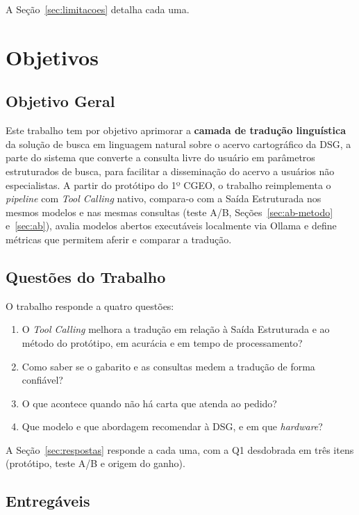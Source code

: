 A Seção~\ref{sec:limitacoes} detalha cada uma.

\section{Objetivos}

\subsection{Objetivo Geral}

Este trabalho tem por objetivo aprimorar a \textbf{camada de tradução linguística} da solução de busca em linguagem natural sobre o acervo cartográfico da DSG, a parte do sistema que converte a consulta livre do usuário em parâmetros estruturados de busca, para facilitar a disseminação do acervo a usuários não especialistas. A partir do protótipo do 1º CGEO, o trabalho reimplementa o \textit{pipeline} com \textit{Tool Calling} nativo, compara-o com a Saída Estruturada nos mesmos modelos e nas mesmas consultas (teste A/B, Seções~\ref{sec:ab-metodo} e~\ref{sec:ab}), avalia modelos abertos executáveis localmente via Ollama e define métricas que permitem aferir e comparar a tradução.

\subsection{Questões do Trabalho}
\label{sec:questoes}

O trabalho responde a quatro questões:
\begin{enumerate}
  \item[Q1.] O \textit{Tool Calling} melhora a tradução em relação à Saída Estruturada e ao método do protótipo, em acurácia e em tempo de processamento?
  \item[Q2.] Como saber se o gabarito e as consultas medem a tradução de forma confiável?
  \item[Q3.] O que acontece quando não há carta que atenda ao pedido?
  \item[Q4.] Que modelo e que abordagem recomendar à DSG, e em que \textit{hardware}?
\end{enumerate}

A Seção~\ref{sec:respostas} responde a cada uma, com a Q1 desdobrada em três itens (protótipo, teste A/B e origem do ganho).

\subsection{Entregáveis}
\label{sec:entregaveis}

